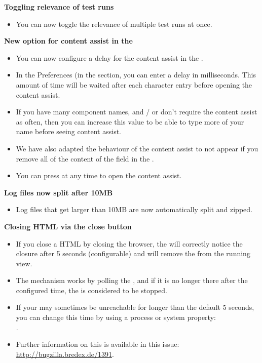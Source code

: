 \textbf{Toggling relevance of test runs}
\begin{itemize}
\item You can now toggle the relevance of multiple test runs at once.
\end{itemize}

\textbf{New option for content assist in the \gdcompnamesview{}}
\begin{itemize}
\item You can now configure a delay for the content assist in the \gdcompnamesview{}.
\item In the Preferences (in the  section, you can enter a delay in milliseconds. This amount of time will be waited after each character entry before opening the content assist.
\item If you have many component names, and / or don't require the content assist as often, then you can increase this value to be able to type more of your name before seeing content assist.
\item We have also adapted the behaviour of the content assist to not appear if you remove all of the content of the  field in the \gdcompnamesview{}. 
\item You can press  at any time to open the content assist.
\end{itemize}

\textbf{Log files now split after 10MB}
\begin{itemize}
\item Log files that get larger than 10MB are now automatically split and zipped.
\end{itemize}

\textbf{Closing HTML \gdauts{} via the close button}
\begin{itemize}
\item If you close a HTML \gdaut{} by closing the browser, the \ite{} will correctly notice the closure after 5 seconds (configurable) and will remove the \gdaut{} from the running \gdauts{} view.
\item The mechanism works by polling the \gdaut{}, and if it is no longer there after the configured time, the \gdaut{} is considered to be stopped.
\item If your \gdaut{} may sometimes be unreachable for longer than the default 5 seconds, you can change this time by using a process or system property:\\
.
\item Further information on this is available in this issue:\\
\url{http://bugzilla.bredex.de/1391}.
\end{itemize}


